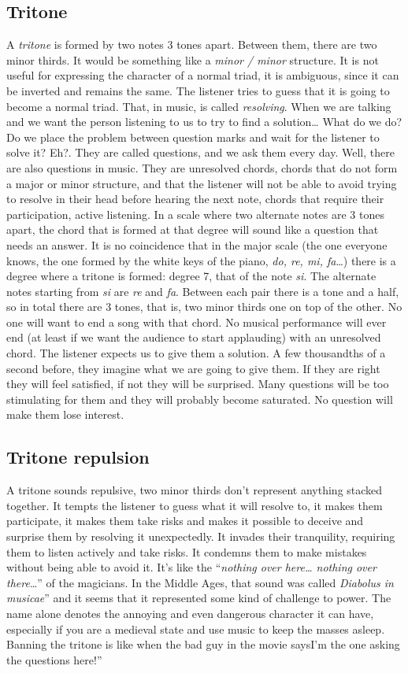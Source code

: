 \documentclass[]{report}
\begin{document}
\subsection{Tritone}
A \emph{tritone} is formed by two notes 3 tones apart. Between them, there are two minor thirds. It would be something like a \emph{minor / minor} structure. It is not useful for expressing the character of a normal triad, it is ambiguous, since it can be inverted and remains the same. The listener tries to guess that it is going to become a normal triad. That, in music, is called \emph{resolving}.
When we are talking and we want the person listening to us to try to find a solution\ldots{} What do we do? Do we place the problem between question marks and wait for the listener to solve it? Eh?. They are called questions, and we ask them every day.
Well, there are also questions in music. They are unresolved chords, chords that do not form a major or minor structure, and that the listener will not be able to avoid trying to resolve in their head before hearing the next note, chords that require their participation, active listening.
In a scale where two alternate notes are 3 tones apart, the chord that is formed at that degree will sound like a question that needs an answer. It is no coincidence that in the major scale (the one everyone knows, the one formed by the white keys of the piano, \emph{do, re, mi, fa}\ldots) there is a degree where a tritone is formed: degree 7, that of the note \emph{si}. The alternate notes starting from \emph{si} are \emph{re} and \emph{fa}. Between each pair there is a tone and a half, so in total there are 3 tones, that is, two minor thirds one on top of the other. No one will want to end a song with that chord.
No musical performance will ever end (at least if we want the audience to start applauding) with an unresolved chord. The listener expects us to give them a solution. A few thousandths of a second before, they imagine what we are going to give them. If they are right they will feel satisfied, if not they will be surprised. Many questions will be too stimulating for them and they will probably become saturated. No question will make them lose interest.
\subsection{Tritone repulsion}
A tritone sounds repulsive, two minor thirds don't represent anything stacked together.
It tempts the listener to guess what it will resolve to, it makes them participate, it makes them take risks and makes it possible to deceive and surprise them by resolving it unexpectedly.
It invades their tranquility, requiring them to listen actively and take risks. It condemns them to make mistakes without being able to avoid it. It's like the ``\emph{nothing over here\ldots{} nothing over there}\ldots{}'' of the magicians.
In the Middle Ages, that sound was called \emph{Diabolus in musicae}'' and it seems that it represented some kind of challenge to power. The name alone denotes the annoying and even dangerous character it can have, especially if you are a medieval state and use music to keep the masses asleep. Banning the tritone is like when the bad guy in the movie saysI'm the one asking the questions here!''
\end{document}
